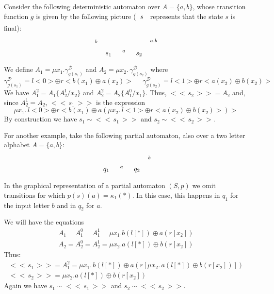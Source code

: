 \documentclass{LMCS}
\newcommand\D{\mathcal{D}}
\def\expr#1{<\!< \, #1 \, >\!>}
\theoremstyle{definition}
\theoremstyle{plain}
\theoremstyle{plain}
\theoremstyle{plain}
\theoremstyle{plain}
\theoremstyle{definition}
\theoremstyle{definition}
\begin{document}
Consider the following
deterministic automaton over $A=\{a,b\}$, whose transition function $g$ is
given by the following picture ($\xymatrix{*++[o][F=]{s}}$
represents that the state $s$ is final):
\[
\xymatrix{*++[o][F]{s_1} \ar[r]^{a}\ar@(l,u)[]^{b}&*++[o][F=]{s_2}
\ar@(r,u)[]_{a, b}}
\]
We define $A_1 = \mu x_1  . \gamma^\D_{g(s_1)}$ and
$A_2 = \mu x_2  . \,  \gamma^\D_{g(s_2)}$ where
\[
 \gamma^\D_{g(s_1)} = l<0> \oplus r<b(x_1) \oplus a(x_2)> \;\;\;\;\;
\gamma^\D_{g(s_2)} =
l<1> \oplus r<a(x_2) \oplus b(x_2)>
\]
We have $A^2_1 = A_1 \{A^1_2/x_2\}$ and $A^2_2 = A_2 \{A^0_1/x_1\} $.
Thus, $\expr {s_2} = A_2$ and, since $A^1_2=A_2$,  $\expr {s_1}$ is the expression 
\[
 \mu x_1 . \, l<0> \oplus r<b(x_1) \oplus a(\mu x_2 . \, l<1> \oplus r<a(x_2) \oplus
b(x_2)>
)>\]
By construction we have $s_1 \sim \expr{s_1}$ and
$s_2 \sim \expr{s_2}$.

For another example, take the following partial automaton, also over a two letter alphabet $A=\{a,b\}$:
\[
\xymatrix{*++[o][F]{q_1} \ar[r]^{a}& *++[o][F]{q_2}
\ar@(r,u)[]_{b}}
\]
In the graphical representation of a partial
automaton $(S,p)$ we omit transitions for which $p(s)(a)
=\kappa_1(*)$. In this case, this happens in $q_1$ for the input
letter $b$ and in $q_2$ for $a$.

We will have the equations
\[
\begin{array}{l}
A_1 = A^0_1 = A^1_1 =  \mu x_1  . b(l[*]) \oplus a(r[x_2]) \\[1ex]
A_2 = A^0_2 = A^1_2 =  \mu x_2  . a(l[*]) \oplus b(r[x_2])
\end{array}
\]
Thus:
\[
\begin{array}{l}
\expr{s_1} = A^2_1 = \mu x_1 . \, b(l[*]) \oplus a(r[\mu x_2 . \,
a(l[*]) \oplus b(r[x_2])])\\
\expr{s_2} = \mu x_2  . a(l[*]) \oplus b(r[x_2])
\end{array}
\]
Again we have $s_1 \sim \expr{s_1}$ and $s_2 \sim \expr {s_2}$. 
\end{document}
